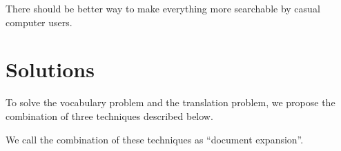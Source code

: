 \documentclass[manuscript,screen,review]{acmart}
\begin{document}

There should be better way to make everything more searchable by casual computer users.

\section{Solutions}


To solve the vocabulary problem and the translation problem,
we propose the combination of three techniques described below.

We call the combination of these techniques as ``document expansion''.
\end{document}
